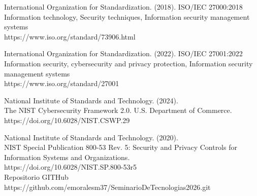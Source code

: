 \documentclass[
	article,			%
	11pt,				%
	oneside,			%
	a4paper,			%
	english,			%
	brazil,				%
	sumario=tradicional
	]{abntex2}
\begin{document}



International Organization for Standardization. (2018). ISO/IEC 27000:2018 \\ Information technology, Security techniques, Information security management systems \\ https://www.iso.org/standard/73906.html

International Organization for Standardization. (2022). ISO/IEC 27001:2022\\ Information security, cybersecurity and privacy protection, Information security management systems \\  https://www.iso.org/standard/27001

National Institute of Standards and Technology. (2024). \\ The NIST Cybersecurity Framework 2.0. U.S. Department of Commerce. \\ https://doi.org/10.6028/NIST.CSWP.29

National Institute of Standards and Technology. (2020). \\ NIST Special Publication 800-53 Rev. 5: Security and Privacy Controls for Information Systems and Organizations. \\
https://doi.org/10.6028/NIST.SP.800-53r5 \\


Repositorio GITHub https://github.com/emoralesm37/SeminarioDeTecnologias2026.git

%
%



\end{document}
